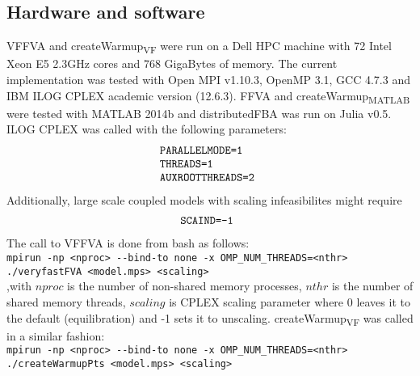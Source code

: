 \subsection{Hardware and software}
VFFVA and createWarmup\textsubscript{VF} were run on a Dell HPC machine with 72 Intel Xeon E5 2.3GHz cores and 768 GigaBytes of memory. The current implementation was tested with Open MPI v1.10.3, OpenMP 3.1, GCC 4.7.3 and IBM ILOG CPLEX academic version (12.6.3). FFVA and createWarmup\textsubscript{MATLAB} were tested with MATLAB 2014b and distributedFBA was run on Julia v0.5. ILOG CPLEX was called with the following parameters:
\begin{equation*} \label{eq:one}
\begin{array}{ll@{}ll}
\texttt{PARALLELMODE=1} &\\
\texttt{THREADS=1} &\\
\texttt{AUXROOTTHREADS=2} &\\
\end{array}
\end{equation*}
Additionally, large scale coupled models with scaling infeasibilites might require 
\begin{equation*} \label{eq:one}
\begin{array}{ll@{}ll}
\texttt{SCAIND=-1} &\\
\end{array}
\end{equation*}
The call to VFFVA is done from bash as follows:\\
\texttt{mpirun -np \textless nproc\textgreater \hspace{0.1cm} -\hspace{0.05cm}-bind-to none -x OMP\_NUM\_THREADS=\textless nthr\textgreater \hspace{0.1cm} ./veryfastFVA \textless model.mps\textgreater \hspace{0.1cm} \textless scaling\textgreater}\\
,with $nproc$ is the number of non-shared memory processes, $nthr$ is the number of shared memory threads, $scaling$ is CPLEX scaling parameter where 0 leaves it to the default (equilibration) and -1 sets it to unscaling. createWarmup\textsubscript{VF} was called in a similar fashion:\\
\texttt{mpirun -np \textless nproc\textgreater \hspace{0.1cm}  -\hspace{0.05cm}-bind-to none -x OMP\_NUM\_THREADS=\textless nthr\textgreater \hspace{0.1cm}\\ ./createWarmupPts \textless model.mps\textgreater \hspace{0.1cm} \textless scaling\textgreater}\\
